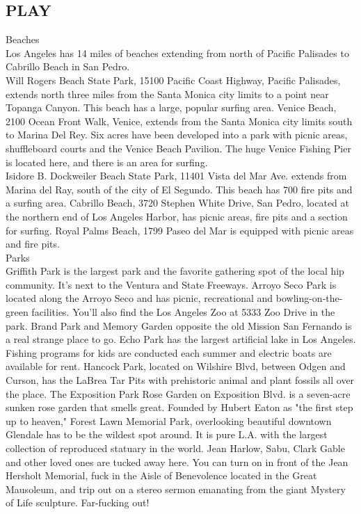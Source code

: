 \documentclass[11pt,twoside,a4paper]{book}
\begin{document}
\subsection{PLAY}
Beaches~\\
Los Angeles has 14 miles of beaches extending from north of Pacific Palisades to Cabrillo Beach in San Pedro.~\\

Will Rogers Beach State Park, 15100 Pacific Coast Highway, Pacific Palisades, extends north three miles from the Santa Monica city limits to a point near Topanga Canyon. This beach has a large, popular surfing area. Venice Beach, 2100 Ocean Front Walk, Venice, extends from the Santa Monica city limits south to Marina Del Rey. Six acres have been developed into a park with picnic areas, shuffleboard courts and the Venice Beach Pavilion. The huge Venice Fishing Pier is located here, and there is an area for surfing.~\\

Isidore B. Dockweiler Beach State Park, 11401 Vista del Mar Ave. extends from Marina del Ray, south of the city of El Segundo. This beach has 700 fire pits and a surfing area. Cabrillo Beach, 3720 Stephen White Drive, San Pedro, located at the northern end of Los Angeles Harbor, has picnic areas, fire pits and a section for surfing. Royal Palms Beach, 1799 Paseo del Mar is equipped with picnic areas and fire pits.~\\

Parks~\\
Griffith Park is the largest park and the favorite gathering spot of the local hip community. It's next to the Ventura and State Freeways. Arroyo Seco Park is located along the Arroyo Seco and has picnic, recreational and bowling-on-the-green facilities. You'll also find the Los Angeles Zoo at 5333 Zoo Drive in the park. Brand Park and Memory Garden opposite the old Mission San Fernando is a real strange place to go. Echo Park has the largest artificial lake in Los Angeles. Fishing programs for kids are conducted each summer and electric boats are available for rent. Hancock Park, located on Wilshire Blvd, between Odgen and Curson, has the LaBrea Tar Pits with prehistoric animal and plant fossils all over the place. The Exposition Park Rose Garden on Exposition Blvd. is a seven-acre sunken rose garden that smells great. Founded by Hubert Eaton as "the first step up to heaven," Forest Lawn Memorial Park, overlooking beautiful downtown Glendale has to be the wildest spot around. It is pure L.A. with the largest collection of reproduced statuary in the world. Jean Harlow, Sabu, Clark Gable and other loved ones are tucked away here. You can turn on in front of the Jean Hersholt Memorial, fuck in the Aisle of Benevolence located in the Great Mausoleum, and trip out on a stereo sermon emanating from the giant Mystery of Life sculpture. Far-fucking out!~\\
\end{document}
